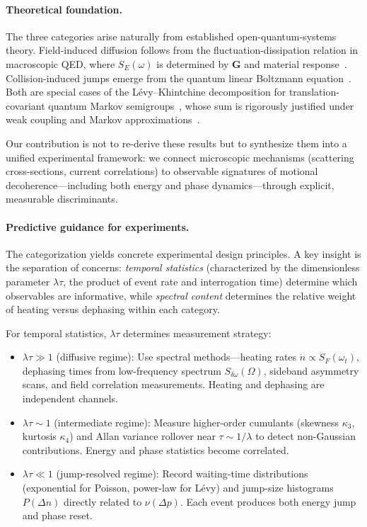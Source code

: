 \paragraph{Theoretical foundation.}
The three categories arise naturally from established open-quantum-systems theory. Field-induced diffusion follows from the fluctuation-dissipation relation in macroscopic QED, where $S_E(\omega)$ is determined by $\mathbf{G}$ and material response~\cite{ScheelBuhmann2008,BrownnuttRMP2015,BuhmannDispersionForcesII}. Collision-induced jumps emerge from the quantum linear Boltzmann equation~\cite{HornbergerSipe2003,VacchiniHornberger2009,OghittuNJPhys2023}. Both are special cases of the L\'evy--Khintchine decomposition for translation-covariant quantum Markov semigroups~\cite{Holevo1993,VacchiniJMathPhys2001}, whose sum is rigorously justified under weak coupling and Markov approximations~\cite{BreuerPetruccione2002}. 

Our contribution is not to re-derive these results but to synthesize them into a unified experimental framework: we connect microscopic mechanisms (scattering cross-sections, current correlations) to observable signatures of motional decoherence—including both energy and phase dynamics—through explicit, measurable discriminants.

\paragraph{Predictive guidance for experiments.}
The categorization yields concrete experimental design principles. A key insight is the separation of concerns: \emph{temporal statistics} (characterized by the dimensionless parameter $\lambda\tau$, the product of event rate and interrogation time) determine which observables are informative, while \emph{spectral content} determines the relative weight of heating versus dephasing within each category.

For temporal statistics, $\lambda\tau$ determines measurement strategy:
\begin{itemize}[leftmargin=*,nosep]
\item $\lambda\tau \gg 1$ (diffusive regime): Use spectral methods—heating rates $\dot{n} \propto S_F(\omega_t)$, dephasing times from low-frequency spectrum $S_{\delta\omega}(\Omega)$, sideband asymmetry scans, and field correlation measurements. Heating and dephasing are independent channels.

\item $\lambda\tau \sim 1$ (intermediate regime): Measure higher-order cumulants (skewness $\kappa_3$, kurtosis $\kappa_4$) and Allan variance rollover near $\tau \sim 1/\lambda$ to detect non-Gaussian contributions. Energy and phase statistics become correlated.

\item $\lambda\tau \ll 1$ (jump-resolved regime): Record waiting-time distributions (exponential for Poisson, power-law for L\'evy) and jump-size histograms $P(\Delta n)$ directly related to $\nu(\Delta p)$. Each event produces both energy jump and phase reset.
\end{itemize}

